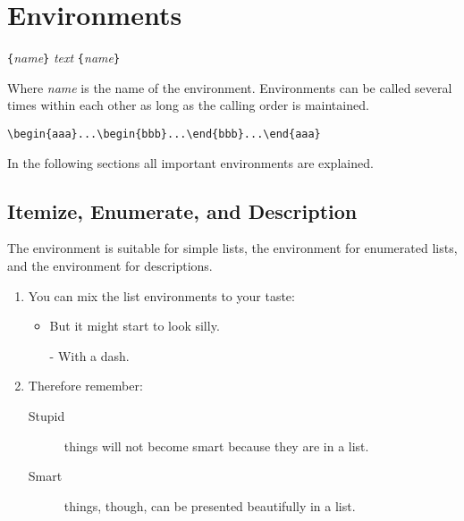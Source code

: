 \section{Environments} \label{env}

\begin{command}
\verb|{|\emph{name}\verb|}|\quad
   \emph{text}\quad
{}\verb|{|\emph{name}\verb|}|
\end{command}
\noindent Where \emph{name} is the name of the environment. Environments can be
called several times within each other as long as the calling order is
maintained.
\begin{code}
\verb|\begin{aaa}...\begin{bbb}...\end{bbb}...\end{aaa}|
\end{code}

\noindent In the following sections all important environments are explained.

\subsection{Itemize, Enumerate, and Description}

The  environment is suitable for simple lists, the
 environment for enumerated lists, and the
 environment for descriptions.

\begin{example}
\flushleft
\begin{enumerate}
\item You can mix the list
environments to your taste:
\begin{itemize}
\item But it might start to
look silly. 
\item[-] With a dash.
\end{itemize}
\item Therefore remember:
\begin{description}
\item[Stupid] things will not
become smart because they are
in a list.
\item[Smart] things, though, can be
presented beautifully in a list.
\end{description}
\end{enumerate}
\end{example}
 

